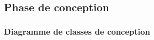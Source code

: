 \subsection[Phase de conception]{Phase de conception}
    \subsubsection[Diagramme de classes de conception]{Diagramme de classes de conception}